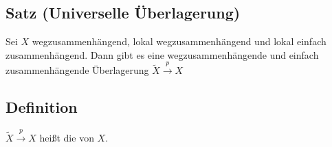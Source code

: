 \subsection{Satz (Universelle Überlagerung)} %
\label{sub:133}
Sei $X$ wegzusammenhängend, lokal wegzusammenhängend und lokal einfach zusammenhängend. Dann gibt es eine wegzusammenhängende und einfach zusammenhängende  Überlagerung 
$\tilde{X} \xrightarrow{p} X $

\subsection[Definition; Universelle Überlagerung]{Definition} %
\label{sub:134}
$\tilde{X} \xrightarrow{p} X $ heißt die  von $X$.
\cleardoubleoddemptypage
{}
\setcounter{page}{1}
\printindex
\listoffigures

